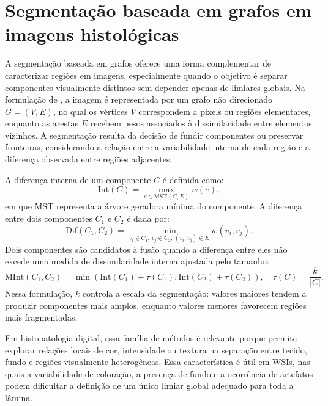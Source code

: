 \section{Segmentação baseada em grafos em imagens histológicas} \label{sec:grafos_limpeza} A segmentação baseada em grafos oferece uma forma complementar de caracterizar regiões em imagens, especialmente quando o objetivo é separar componentes visualmente distintos sem depender apenas de limiares globais. Na formulação de \textcite{felzenszwalb2004efficient}, a imagem é representada por um grafo não direcionado $G=(V,E)$, no qual os vértices $V$ correspondem a pixels ou regiões elementares, enquanto as arestas $E$ recebem pesos associados à dissimilaridade entre elementos vizinhos. A segmentação resulta da decisão de fundir componentes ou preservar fronteiras, considerando a relação entre a variabilidade interna de cada região e a diferença observada entre regiões adjacentes.

A diferença interna de um componente $C$ é definida como:
\begin{equation}\label{eq:internal-difference} \mathrm{Int}(C)=\max_{e\in\mathrm{MST}(C,E)} w(e), \end{equation} 
em que $\mathrm{MST}$ representa a árvore geradora mínima do componente. A diferença entre dois componentes $C_1$ e $C_2$ é dada por:
\begin{equation}\label{eq:component-difference} \mathrm{Dif}(C_1,C_2)= \min_{v_i\in C_1,\,v_j\in C_2,\,(v_i,v_j)\in E} w(v_i,v_j). \end{equation}
Dois componentes são candidatos à fusão quando a diferença entre eles não excede uma medida de dissimilaridade interna ajustada pelo tamanho:
\begin{equation}\label{eq:mint} \mathrm{MInt}(C_1,C_2)= \min\left(\mathrm{Int}(C_1)+\tau(C_1),\mathrm{Int}(C_2)+\tau(C_2)\right), \quad \tau(C)=\frac{k}{|C|}. \end{equation}
Nessa formulação, $k$ controla a escala da segmentação: valores maiores tendem a produzir componentes mais amplos, enquanto valores menores favorecem regiões mais fragmentadas. 

Em histopatologia digital, essa família de métodos é relevante porque permite explorar relações locais de cor, intensidade ou textura na separação entre tecido, fundo e regiões visualmente heterogêneas. Essa característica é útil em WSIs, nas quais a variabilidade de coloração, a presença de fundo e a ocorrência de artefatos podem dificultar a definição de um único limiar global adequado para toda a lâmina. 

